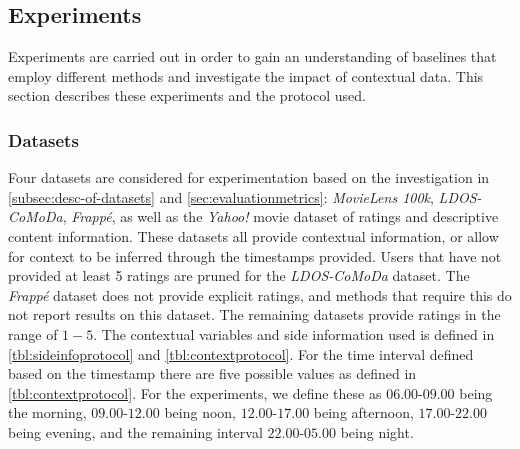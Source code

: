 \subsection{Experiments}\label{subsec:experimentprotocol}
Experiments are carried out in order to gain an understanding of baselines that employ different methods and investigate the impact of contextual data.
This section describes these experiments and the protocol used.

\subsubsection{Datasets}
Four datasets are considered for experimentation based on the investigation in \autoref{subsec:desc-of-datasets} and \autoref{sec:evaluationmetrics}: \textit{MovieLens 100k}, \textit{LDOS-CoMoDa}, \textit{Frappé}, as well as the \textit{Yahoo!} movie dataset of ratings and descriptive content information\cite{yahoo-movie}.
These datasets all provide contextual information, or allow for context to be inferred through the timestamps provided.
Users that have not provided at least 5 ratings are pruned for the \textit{LDOS-CoMoDa} dataset.
The \textit{Frappé} dataset does not provide explicit ratings, and methods that require this do not report results on this dataset.
The remaining datasets provide ratings in the range of $1-5$.
The contextual variables and side information used is defined in \autoref{tbl:sideinfoprotocol} and \autoref{tbl:contextprotocol}.
For the time interval defined based on the timestamp there are five possible values as defined in \autoref{tbl:contextprotocol}.
For the experiments, we define these as $06.00$-$09.00$ being the morning, $09.00$-$12.00$ being noon, $12.00$-$17.00$ being afternoon, $17.00$-$22.00$ being evening, and the remaining interval $22.00$-$05.00$ being night.
\\
